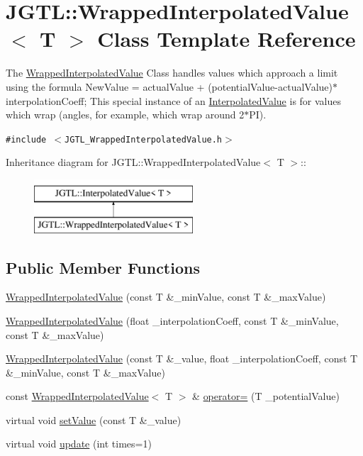 \hypertarget{class_j_g_t_l_1_1_wrapped_interpolated_value}{
\section{JGTL::Wrapped\-Interpolated\-Value$<$ T $>$ Class Template Reference}
\label{class_j_g_t_l_1_1_wrapped_interpolated_value}
}
The \hyperlink{class_j_g_t_l_1_1_wrapped_interpolated_value}{Wrapped\-Interpolated\-Value} Class handles values which approach a limit using the formula New\-Value = actual\-Value + (potential\-Value-actual\-Value)$\ast$interpolation\-Coeff; This special instance of an \hyperlink{class_j_g_t_l_1_1_interpolated_value}{Interpolated\-Value} is for values which wrap (angles, for example, which wrap around 2$\ast$PI).  


{\tt \#include $<$JGTL\_\-Wrapped\-Interpolated\-Value.h$>$}

Inheritance diagram for JGTL::Wrapped\-Interpolated\-Value$<$ T $>$::\begin{figure}[H]
\begin{center}
\leavevmode
\includegraphics[height=2cm]{class_j_g_t_l_1_1_wrapped_interpolated_value}
\end{center}
\end{figure}
\subsection*{Public Member Functions}
\begin{CompactItemize}
\item 
\hyperlink{class_j_g_t_l_1_1_wrapped_interpolated_value_ee757c96b36d3c8f65accff6005e5c11}{Wrapped\-Interpolated\-Value} (const T \&\_\-min\-Value, const T \&\_\-max\-Value)
\item 
\hyperlink{class_j_g_t_l_1_1_wrapped_interpolated_value_689683a55642976810f0f244f644f814}{Wrapped\-Interpolated\-Value} (float \_\-interpolation\-Coeff, const T \&\_\-min\-Value, const T \&\_\-max\-Value)
\item 
\hyperlink{class_j_g_t_l_1_1_wrapped_interpolated_value_a5c969b821b5c9b1bd4342688264c82c}{Wrapped\-Interpolated\-Value} (const T \&\_\-value, float \_\-interpolation\-Coeff, const T \&\_\-min\-Value, const T \&\_\-max\-Value)
\item 
const \hyperlink{class_j_g_t_l_1_1_wrapped_interpolated_value}{Wrapped\-Interpolated\-Value}$<$ T $>$ \& \hyperlink{class_j_g_t_l_1_1_wrapped_interpolated_value_0608de450007ab26e20cd9a680da7e84}{operator=} (T \_\-potential\-Value)
\item 
virtual void \hyperlink{class_j_g_t_l_1_1_wrapped_interpolated_value_1cc76107e67afe602b384a1ecc9e2840}{set\-Value} (const T \&\_\-value)
\item 
virtual void \hyperlink{class_j_g_t_l_1_1_wrapped_interpolated_value_2bdc736eda165b27af022bae1f352aae}{update} (int times=1)
\end{CompactItemize}
